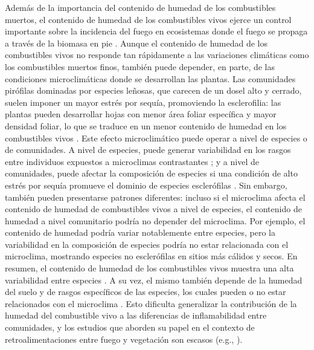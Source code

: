 Además de la importancia del contenido de humedad de los combustibles muertos, el contenido de humedad de los combustibles vivos ejerce un control importante sobre la incidencia del fuego en ecosistemas donde el fuego se propaga a través de la biomasa en pie \citep{dennison_critical_2009, nolan_large-scale_2016, ruffault_extreme_2018, pimont_why_2019}. Aunque el contenido de humedad de los combustibles vivos no responde tan rápidamente a las variaciones climáticas como los combustibles muertos finos, también puede depender, en parte, de las condiciones microclimáticas donde se desarrollan las plantas. Las comunidades pirófilas dominadas por especies leñosas, que carecen de un dosel alto y cerrado, suelen imponer un mayor estrés por sequía, promoviendo la esclerofilia: las plantas pueden desarrollar hojas con menor área foliar específica y mayor densidad foliar, lo que se traduce en un menor contenido de humedad en los combustibles vivos \citep{cornelissen_handbook_2003, aroca_plant_2012}. Este efecto microclimático puede operar a nivel de especies o de comunidades. A nivel de especies, puede generar variabilidad en los rasgos entre individuos expuestos a microclimas contrastantes \citep{blackhall_is_2012}; y a nivel de comunidades, puede afectar la composición de especies si una condición de alto estrés por sequía promueve el dominio de especies esclerófilas \citep{ackerly_leaf_2002}. Sin embargo, también pueden presentarse patrones diferentes: incluso si el microclima afecta el contenido de humedad de combustibles vivos a nivel de especies, el contenido de humedad a nivel comunitario podría no depender del microclima. Por ejemplo, el contenido de humedad podría variar notablemente entre especies, pero la variabilidad en la composición de especies podría no estar relacionada con el microclima, mostrando especies no esclerófilas en sitios más cálidos y secos. En resumen, el contenido de humedad de los combustibles vivos muestra una alta variabilidad entre especies \citep{bianchi_comparison_2018, blackhall_flammability_2019}. A su vez, el mismo también depende de la humedad del suelo y de rasgos específicos de las especies, los cuales pueden o no estar relacionados con el microclima \citep{pivovaroff_effect_2019}. Esto dificulta generalizar la contribución de la humedad del combustible vivo a las diferencias de inflamabilidad entre comunidades, y los estudios que aborden su papel en el contexto de retroalimentaciones entre fuego y vegetación son escasos (e.g., \citealt{blackhall_is_2012}).

